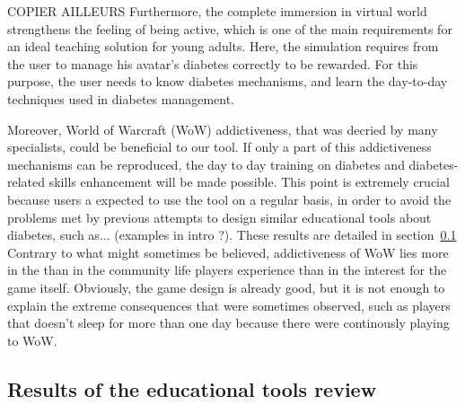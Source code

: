 \documentclass[12pt,MSc]{muthesis}
\begin{document}


\iffalse COPIER AILLEURS Furthermore, the complete immersion in virtual world strengthens the feeling of being active, which is one of the main requirements for an ideal teaching solution for young adults. Here, the simulation requires from the user to manage his avatar's diabetes correctly to be rewarded. For this purpose, the user needs to know diabetes mechanisms, and learn the day-to-day techniques used in diabetes management. 

Moreover, World of Warcraft (WoW) addictiveness, that was decried by many specialists, could be beneficial to our tool. If only a part of this addictiveness mechanisms can be reproduced, the day to day training on diabetes and diabetes-related skills enhancement will be made possible. This point is extremely crucial because users a expected to use the tool on a regular basis, in order to avoid the problems met by previous attempts to design similar educational tools about diabetes, such as... (examples in intro ?). These results are detailed in section~\ref{sec:resultsOfToolReview}\\

Contrary to what might sometimes be believed, addictiveness of WoW lies more in the than in the community life players experience than in the interest for the game itself. Obviously, the game design is already good, but it is not enough to explain the extreme consequences that were sometimes observed, such as players that doesn't sleep for more than one day because there were continously playing to WoW. 

\subsection{Results of the educational tools review}
\label{sec:resultsOfToolReview}
\end{document}

